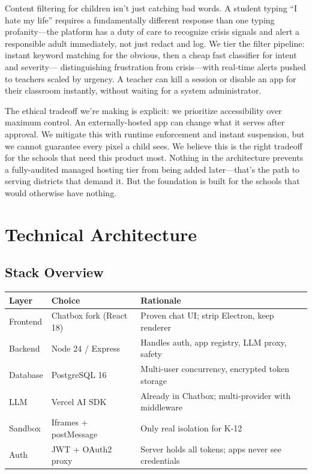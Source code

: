 \documentclass[11pt,letterpaper]{article}
\begin{document}
Content filtering for children isn't just catching bad words. A student typing ``I hate
my life'' requires a fundamentally different response than one typing profanity---the
platform has a duty of care to recognize crisis signals and alert a responsible adult
immediately, not just redact and log. We tier the filter pipeline: instant keyword
matching for the obvious, then a cheap fast classifier for intent and severity---
distinguishing frustration from crisis---with real-time alerts pushed to teachers
scaled by urgency. A teacher can kill a session or disable an app for their classroom
instantly, without waiting for a system administrator.

The ethical tradeoff we're making is explicit: we prioritize accessibility over maximum
control. An externally-hosted app can change what it serves after approval. We mitigate
this with runtime enforcement and instant suspension, but we cannot guarantee every pixel
a child sees. We believe this is the right tradeoff for the schools that need this
product most. Nothing in the architecture prevents a fully-audited managed hosting tier
from being added later---that's the path to serving districts that demand it. But the
foundation is built for the schools that would otherwise have nothing.

\section*{Technical Architecture}

\subsection*{Stack Overview}

\begin{tabularx}{\textwidth}{l l X}
\toprule
\textbf{Layer} & \textbf{Choice} & \textbf{Rationale} \\
\midrule
Frontend & Chatbox fork (React 18) & Proven chat UI; strip Electron, keep renderer \\
Backend & Node 24 / Express & Handles auth, app registry, LLM proxy, safety \\
Database & PostgreSQL 16 & Multi-user concurrency, encrypted token storage \\
LLM & Vercel AI SDK & Already in Chatbox; multi-provider with middleware \\
Sandbox & Iframes + postMessage & Only real isolation for K-12 \\
Auth & JWT + OAuth2 proxy & Server holds all tokens; apps never see credentials \\
\bottomrule
\end{tabularx}
\end{document}
